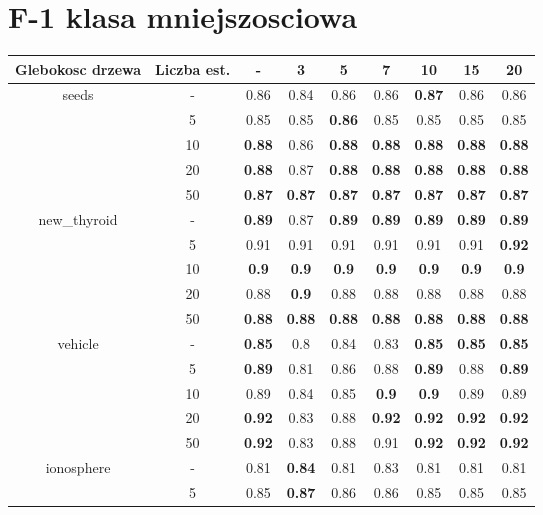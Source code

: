 \documentclass{article}%
\begin{document}
%
\section*{F{-}1 klasa mniejszosciowa}%
\begin{longtable}{c|c|ccccccc}%
\hline%
Glebokosc drzewa&Liczba est.&{-}&3&5&7&10&15&20\\%
\hline%
\multirow{5}{*}{seeds}&{-}&0.86&0.84&0.86&0.86&\textbf{0.87}&0.86&0.86\\%
\cline{2%
-%
9}%
&5&0.85&0.85&\textbf{0.86}&0.85&0.85&0.85&0.85\\%
\cline{2%
-%
9}%
&10&\textbf{0.88}&0.86&\textbf{0.88}&\textbf{0.88}&\textbf{0.88}&\textbf{0.88}&\textbf{0.88}\\%
\cline{2%
-%
9}%
&20&\textbf{0.88}&0.87&\textbf{0.88}&\textbf{0.88}&\textbf{0.88}&\textbf{0.88}&\textbf{0.88}\\%
\cline{2%
-%
9}%
&50&\textbf{0.87}&\textbf{0.87}&\textbf{0.87}&\textbf{0.87}&\textbf{0.87}&\textbf{0.87}&\textbf{0.87}\\%
\hline%
\multirow{5}{*}{new\_thyroid}&{-}&\textbf{0.89}&0.87&\textbf{0.89}&\textbf{0.89}&\textbf{0.89}&\textbf{0.89}&\textbf{0.89}\\%
\cline{2%
-%
9}%
&5&0.91&0.91&0.91&0.91&0.91&0.91&\textbf{0.92}\\%
\cline{2%
-%
9}%
&10&\textbf{0.9}&\textbf{0.9}&\textbf{0.9}&\textbf{0.9}&\textbf{0.9}&\textbf{0.9}&\textbf{0.9}\\%
\cline{2%
-%
9}%
&20&0.88&\textbf{0.9}&0.88&0.88&0.88&0.88&0.88\\%
\cline{2%
-%
9}%
&50&\textbf{0.88}&\textbf{0.88}&\textbf{0.88}&\textbf{0.88}&\textbf{0.88}&\textbf{0.88}&\textbf{0.88}\\%
\hline%
\multirow{5}{*}{vehicle}&{-}&\textbf{0.85}&0.8&0.84&0.83&\textbf{0.85}&\textbf{0.85}&\textbf{0.85}\\%
\cline{2%
-%
9}%
&5&\textbf{0.89}&0.81&0.86&0.88&\textbf{0.89}&0.88&\textbf{0.89}\\%
\cline{2%
-%
9}%
&10&0.89&0.84&0.85&\textbf{0.9}&\textbf{0.9}&0.89&0.89\\%
\cline{2%
-%
9}%
&20&\textbf{0.92}&0.83&0.88&\textbf{0.92}&\textbf{0.92}&\textbf{0.92}&\textbf{0.92}\\%
\cline{2%
-%
9}%
&50&\textbf{0.92}&0.83&0.88&0.91&\textbf{0.92}&\textbf{0.92}&\textbf{0.92}\\%
\hline%
\multirow{5}{*}{ionosphere}&{-}&0.81&\textbf{0.84}&0.81&0.83&0.81&0.81&0.81\\%
\cline{2%
-%
9}%
&5&0.85&\textbf{0.87}&0.86&0.86&0.85&0.85&0.85\\%

\end{longtable}
\end{document}
